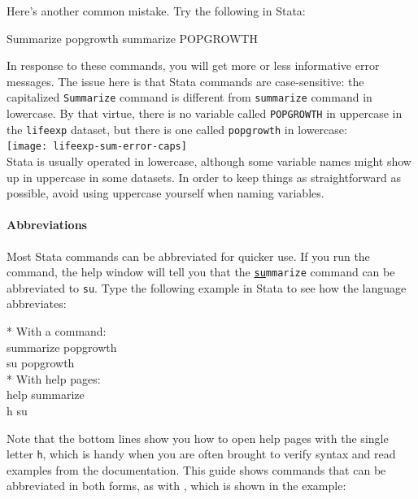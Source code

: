 		Here's another common mistake. Try the following in Stata:%
		
		\begin{docspec}
			Summarize popgrowth
			summarize POPGROWTH
		\end{docspec}

		In response to these commands, you will get more or less informative error messages. The issue here is that Stata commands are case-sensitive: the capitalized \texttt{Summarize} command is different from \texttt{summarize} command in lowercase. By that virtue, there is no variable called \texttt{POPGROWTH} in uppercase in the \texttt{lifeexp} dataset, but there is one called \texttt{popgrowth} in lowercase:\\[1em]%

		\texttt{[image: lifeexp-sum-error-caps]}\\[1em]
		
		Stata is usually operated in lowercase, although some variable names might show up in uppercase in some datasets. In order to keep things as straightforward as possible, avoid using uppercase yourself when naming variables.%
		
		\paragraph{Abbreviations}%

		Most Stata commands can be abbreviated for quicker use. If you run the  command, the help window will tell you that the \texttt{\underline{su}mmarize} command can be abbreviated to \texttt{su}. Type the following example in Stata to see how the language abbreviates:%
    
  	\begin{docspec}
  		* With a command:\\%
  		summarize popgrowth\\%
  		su popgrowth\\[1em]%
  		* With help pages:\\%
  		help summarize\\%
  		h su%
  	\end{docspec}%

  Note that the bottom lines show you how to open help pages with the single letter \texttt{h}, which is handy when you are often brought to verify syntax and read examples from the documentation. This guide shows commands that can be abbreviated in both forms, as with , which is shown in the example:\\[1em]%

